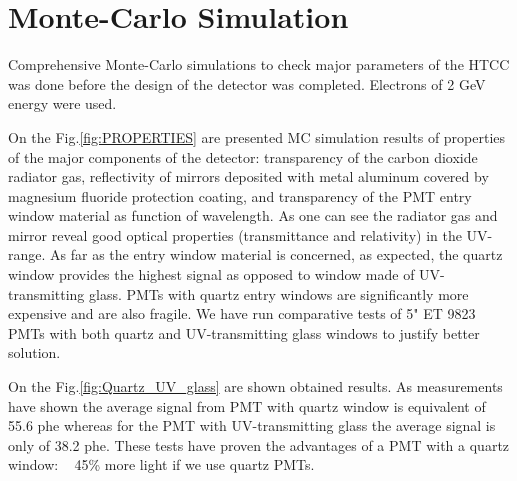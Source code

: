 \section{Monte-Carlo Simulation} 
Comprehensive Monte-Carlo simulations to check major parameters of the HTCC was done before the design of the detector was completed. Electrons of 2 GeV energy were used.    

\indent On the Fig.\ref{fig:PROPERTIES} are presented MC simulation results of properties of the major components of the detector: transparency of the carbon dioxide radiator gas, reflectivity of mirrors deposited with metal aluminum covered by magnesium fluoride protection coating, and transparency of the PMT entry window material as function of wavelength. As one can see the radiator gas and mirror reveal good optical properties (transmittance and relativity) in the UV-range. As far as the entry window material is concerned, as expected, the quartz window provides the highest signal as opposed to window made of UV-transmitting glass. PMTs with quartz entry windows are significantly more expensive and are also fragile. We have run comparative tests of 5" ET 9823 PMTs with both quartz and UV-transmitting glass windows to justify better solution. 

On the Fig.\ref{fig:Quartz_UV_glass} are shown obtained results. As measurements have shown the average signal from PMT with quartz window is equivalent of 55.6 phe whereas for the PMT with UV-transmitting glass the average signal is only of 38.2 phe. These tests have proven the advantages of a PMT with a quartz window: ~ 45\% more light if we use quartz PMTs.

